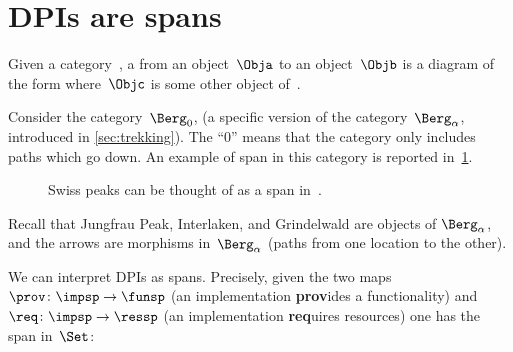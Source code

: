 
\section{DPIs are spans}
\label{sec:spans}


\begin{ctdefinition}[Span]
    \label{def:span}
    Given a category~\CatC, a \emph{} from an object~$\Obja$ to an object~$\Objb$ is a diagram of the form
    where~$\Objc$ is some other object of~\CatC.
\end{ctdefinition}

\begin{example}
    Consider the category~$\Berg_0$, (a specific version of the category~$\Berg_\alpha$, introduced in \cref{sec:trekking}).
    The ``0'' means that the category only includes paths which go down.
    An example of span in this category is reported in~\cref{fig:exmountains}.
    \begin{figure}[h!]
        \centering
        \caption{Swiss peaks can be thought of as a span in~\Berg.}
        \label{fig:exmountains}
    \end{figure}
    Recall that \textsf{Jungfrau Peak}, \textsf{Interlaken}, and \textsf{Grindelwald} are objects of $\Berg_\alpha$, and the arrows are morphisms in~$\Berg_\alpha$ (paths from one location to the other).
\end{example}

We can interpret DPIs as spans.
Precisely, given the two maps~$\prov \colon \impsp \to \funsp$ (an implementation \textbf{prov}ides a functionality) and~$\req\colon \impsp \to \ressp$ (an implementation \textbf{req}uires resources) one has the span in~$\Set$:
\begin{center}
\end{center}

